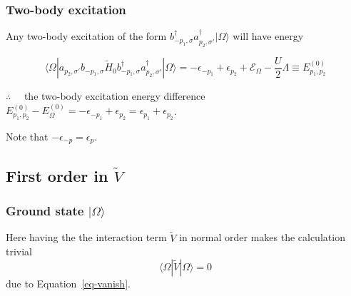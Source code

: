 \documentclass[
  letterpaper,
  DIV=11,
  numbers=noendperiod]{scrartcl}
\begin{document}
\subsubsection{Two-body excitation}\label{two-body-excitation}

Any two-body excitation of the form
\(b^\dagger_{-p_1,\sigma}a^\dagger_{p_2,\sigma'}|\Omega\rangle\) will
have energy

\begin{equation}
\langle\Omega|a_{p_2,\sigma'}b_{-p_1,\sigma}\tilde H_0 b^\dagger_{-p_1,\sigma}a^\dagger_{p_2,\sigma'}|\Omega\rangle=-\epsilon_{-p_1}+\epsilon_{p_2}+\mathcal{E}_{\Omega}-\frac{U}{2}\Lambda\equiv E^{(0)}_{p_1,p_2}
\end{equation}

\begin{tcolorbox}[enhanced jigsaw, arc=.35mm, bottomrule=.15mm, bottomtitle=1mm, breakable, colback=white, colbacktitle=quarto-callout-note-color!10!white, colframe=quarto-callout-note-color-frame, coltitle=black, left=2mm, leftrule=.75mm, opacityback=0, opacitybacktitle=0.6, rightrule=.15mm, title=\textcolor{quarto-callout-note-color}{\faInfo}\hspace{0.5em}{Energy difference at \(\mathcal{O}(V^0)\)}, titlerule=0mm, toprule=.15mm, toptitle=1mm]

\(\therefore\quad\) the two-body excitation energy difference
\(E^{(0)}_{p_1,p_2}-E^{(0)}_\Omega=-\epsilon_{-p_1}+\epsilon_{p_2}=\epsilon_{p_1}+\epsilon_{p_2}\).

\end{tcolorbox}

Note that \(-\epsilon_{-p}=\epsilon_p\).

\subsection{\texorpdfstring{First order in
\(\tilde V\)}{First order in \textbackslash tilde V}}\label{first-order-in-tilde-v}

\subsubsection{\texorpdfstring{Ground state
\(|\Omega\rangle\)}{Ground state \textbar\textbackslash Omega\textbackslash rangle}}\label{ground-state-omegarangle-1}

Here having the the interaction term \(\tilde V\) in normal order makes
the calculation trivial \[
\langle \Omega|\tilde V|\Omega\rangle=0
\] due to Equation~\ref{eq-vanish}.
\end{document}
